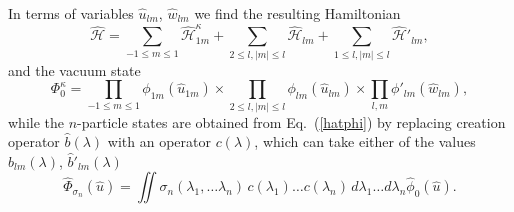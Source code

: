 \documentclass[12pt]{article}
\newcommand{\HH}{\mathscr{H}}
\begin{document}
	In terms of variables
$ \hat{u}_{lm} $,
$ \hat{w}_{lm} $
	we find the resulting Hamiltonian
\begin{equation*}
    \hat{\HH} = \sum_{-1\leq m\leq 1} \hat{\HH}_{1m}^{\kappa}
	+ \sum_{2\leq l, |m|\leq l} \hat{\HH}_{lm}
	+ \sum_{1\leq l, |m|\leq l} \hat{\HH}'_{lm} ,
\end{equation*}
	and the vacuum state
\begin{equation*}
    \Phi_{0}^{\kappa} = \prod_{-1\leq m \leq 1} \phi_{1m}(\hat{u}_{1m}) \times
    \prod_{2\leq l, |m|\leq l} \phi_{lm}(\hat{u}_{lm}) \times
	\prod_{l,m} \phi'_{lm}(\hat{w}_{lm}) ,
\end{equation*}
	while the
$ n $-particle states are obtained from
Eq.~(\ref{hatphi})
	by replacing creation operator
$ \hat{b}(\lambda) $ with an operator
$ c(\lambda) $,
	which can take either of the values
$ \hat{b}_{lm}(\lambda) $, $ \hat{b}'_{lm}(\lambda) $
\begin{equation*}
    \hat{\Phi}_{\sigma_{n}}(\hat{u}) = \iint
    \sigma_{n} (\lambda_{1},\ldots \lambda_{n}) \,
	c(\lambda_{1}) \ldots c(\lambda_{n}) \,
    d\lambda_{1} \ldots d\lambda_{n} \hat{\phi}_{0}(\hat{u}) .
\end{equation*}




\end{document}
